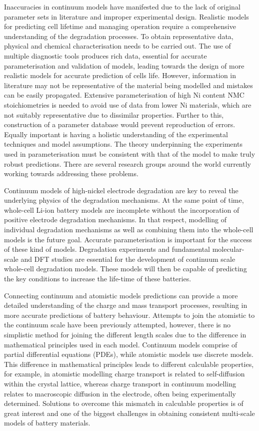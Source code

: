 \documentclass[journal=jacsat,manuscript=article]{achemso}
\begin{document}
Inaccuracies in continuum models have manifested due to the lack of original parameter sets in literature and improper experimental design. Realistic models for predicting cell lifetime and managing operation require a comprehensive understanding of the degradation processes. To obtain representative data, physical and chemical characterisation needs to be carried out. The use of multiple diagnostic tools produces rich data, essential for accurate parameterisation and validation of models, leading towards the design of more realistic models for accurate prediction of cells life. However, information in literature may not be representative of the material being modelled and mistakes can be easily propagated.\cite{Howey_2020} Extensive parameterisation of high Ni content NMC stoichiometries is needed to avoid use of data from lower Ni materials, which are not suitably representative due to dissimilar properties. Further to this, construction of a parameter database would prevent reproduction of errors. Equally important is having a holistic understanding of the experimental techniques and model assumptions. The theory underpinning the experiments used in parameterisation must be consistent with that of the model to make truly robust predictions. There are several research groups around the world currently working towards addressing these problems.

Continuum models of high-nickel electrode degradation are key to reveal the underlying physics of the degradation mechanisms. At the same point of time, whole-cell Li-ion battery models are incomplete without the incorporation of positive electrode degradation mechanisms. In that respect, modelling of individual degradation mechanisms as well as combining them into the whole-cell models is the future goal. Accurate parameterisation is important for the success of these kind of models. Degradation experiments and fundamental molecular-scale and DFT studies are essential for the development of continuum scale whole-cell degradation models.\cite{Sulzer_2020} These models will then be capable of predicting the key conditions to increase the life-time of these batteries.

Connecting continuum and atomistic models predictions can provide a more detailed understanding of the charge and mass transport processes, resulting in more accurate predictions of battery behaviour. Attempts to join the atomistic to the continuum scale have been previously attempted, however, there is no simplistic method for joining the different length scales due to the difference in mathematical principles used in each model.\cite{Fackeldey2015} Continuum models comprise of partial differential equations (PDEs), while atomistic models use discrete models.\cite{Badia2007} This difference in mathematical principles leads to different calculable properties, for example, in atomistic modelling charge transport is related to self-diffusion within the crystal lattice, whereas charge transport in continuum modelling relates to macroscopic diffusion in the electrode, often being experimentally determined. Solutions to overcome this mismatch in calculable properties is of great interest and one of the biggest challenges in obtaining consistent multi-scale models of battery materials.


\end{document}
